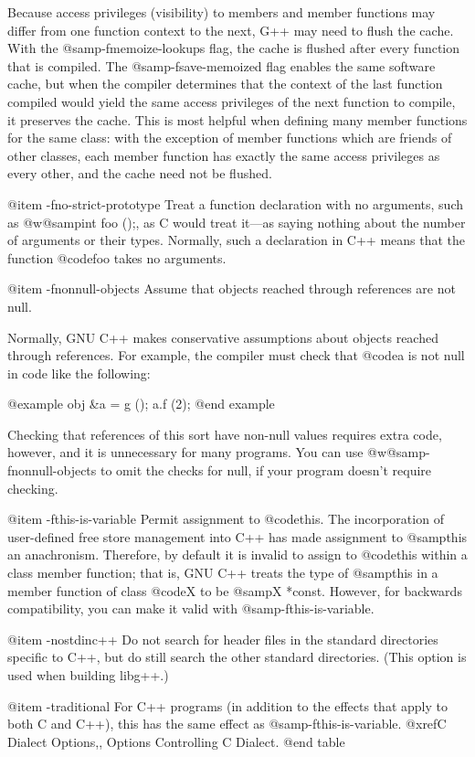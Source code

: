 {Because access privileges (visibility) to members and member functions
may differ from one function context to the next, G++ may need to flush
the cache.  With the @samp{-fmemoize-lookups} flag, the cache is flushed
after every function that is compiled.  The @samp{-fsave-memoized} flag
enables the same software cache, but when the compiler determines that
the context of the last function compiled would yield the same access
privileges of the next function to compile, it preserves the cache.
This is most helpful when defining many member functions for the same
class: with the exception of member functions which are friends of other
classes, each member function has exactly the same access privileges as
every other, and the cache need not be flushed.

@item -fno-strict-prototype
Treat a function declaration with no arguments, such as @w{@samp{int foo
();}}, as C would treat it---as saying nothing about the number of
arguments or their types.  Normally, such a declaration in C++ means
that the function @code{foo} takes no arguments.

@item -fnonnull-objects
Assume that objects reached through references are not null.

Normally, GNU C++ makes conservative assumptions about objects reached
through references.  For example, the compiler must check that @code{a}
is not null in code like the following:

@example
obj &a = g ();
a.f (2);
@end example

Checking that references of this sort have non-null values requires
extra code, however, and it is unnecessary for many programs.  You can
use @w{@samp{-fnonnull-objects}} to omit the checks for null, if your
program doesn't require checking.

@item -fthis-is-variable
Permit assignment to @code{this}.  The incorporation of
user-defined free store management into C++ has made assignment to
@samp{this} an anachronism.  Therefore, by default it is invalid to
assign to @code{this} within a class member function; that is, GNU C++
treats the type of @samp{this} in a member function of class @code{X}
to be @samp{X *const}.  However, for backwards compatibility, you can
make it valid with @samp{-fthis-is-variable}.

@item -nostdinc++
Do not search for header files in the standard directories specific to
C++, but do still search the other standard directories.  (This option
is used when building libg++.)

@item -traditional
For C++ programs (in addition to the effects that apply to both C and
C++), this has the same effect as @samp{-fthis-is-variable}.
@xref{C Dialect Options,, Options Controlling C Dialect}.
@end table

}
